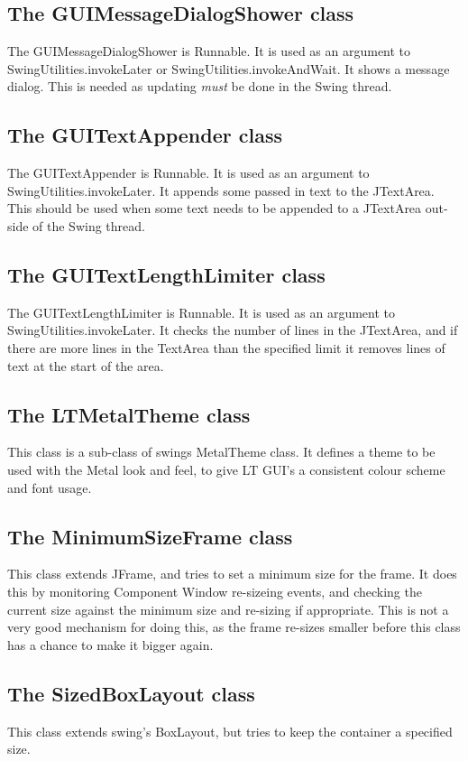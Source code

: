 \documentclass[10pt,a4paper]{article}
\begin{document}
\subsection{The GUIMessageDialogShower class}
The  GUIMessageDialogShower is Runnable. It is used as an argument to SwingUtilities.invokeLater or
SwingUtilities.invokeAndWait. It shows a message dialog. This is needed as updating {\em must} be done
in the Swing thread.

\subsection{The GUITextAppender class}
The GUITextAppender is Runnable. It is used as an argument to SwingUtilities.invokeLater.
It appends some passed in text to the JTextArea. This should be used when some text needs to
be appended to a JTextArea out-side of the Swing thread.

\subsection{The GUITextLengthLimiter class}
The GUITextLengthLimiter is Runnable. It is used as an argument to SwingUtilities.invokeLater.
It checks the number of lines in the JTextArea, and if there are more lines in the TextArea than the
specified limit it removes lines of text at the start of the area. 

\subsection{The LTMetalTheme class}
This class is a sub-class of swings MetalTheme class. It defines a theme to be used with the
Metal look and feel, to give LT GUI's a consistent colour scheme and font usage.

\subsection{The MinimumSizeFrame class}
This class extends JFrame, and tries to set a minimum size for the frame.
It does this by monitoring Component Window re-sizeing events, and checking the current size	
against the minimum size and re-sizing if appropriate. This is not a very good mechanism
for doing this, as the frame re-sizes smaller before this class has a chance to make it bigger again.

\subsection{The SizedBoxLayout class}
This class extends swing's BoxLayout, but tries to keep the container a specified size.
\end{document}
